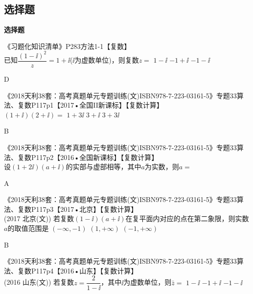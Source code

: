   \subsection{选择题}\begin{exercise}{\bf 选择题}
    \item 《习题化知识清单》P283方法1-1【复数】\\
      已知$\dfrac{(1-\ii)^2}z=1+\ii$($\ii$为虚数单位)，则复数$z=$\xz
       {$1-\ii$}
       {$-1+\ii$}
       {$-1-\ii$}
      \begin{answer}
        D
      \end{answer}
    \item 《2018天利38套：高考真题单元专题训练(文)ISBN978-7-223-03161-5》专题33算法、复数P117p1【2017•全国II新课标】【复数计算】\\
        $(1+\ii)(2+\ii)=$\xz
         {$1+3\ii$}
         {$3+\ii$}
         {$3+3\ii$}
        \begin{answer}
          B
        \end{answer}
    \item 《2018天利38套：高考真题单元专题训练(文)ISBN978-7-223-03161-5》专题33算法、复数P117p2【2016•全国新课标】【复数计算】\\
        设$(1+2\ii)(a+\ii)$的实部与虚部相等，其中$a$为实数，则$a=$\xz
        \begin{answer}
          A
        \end{answer}
    \item 《2018天利38套：高考真题单元专题训练(文)ISBN978-7-223-03161-5》专题33算法、复数P117p3【2017•北京】【复数计算】\\
        {\kaishu (2017 \textbullet 北京(文))}
        若复数$(1-\ii)(a+\ii)$在复平面内对应的点在第二象限，则实数$a$的取值范围是\xz
         {$(-\infty,-1)$}
         {$(1,+\infty)$}
         {$(-1,+\infty)$}
        \begin{answer}
          B
        \end{answer}
    \item 《2018天利38套：高考真题单元专题训练(文)ISBN978-7-223-03161-5》专题33算法、复数P117p4【2016•山东】【复数计算】\\
        {\kaishu (2016 \textbullet 山东(文))}
        若复数$z=\dfrac2{1-\ii}$，其中$\ii$为虚数单位，则$\bar z=$\xz
         {$1-\ii$}
         {$-1+\ii$}
         {$-1-\ii$}

\end{exercise}
